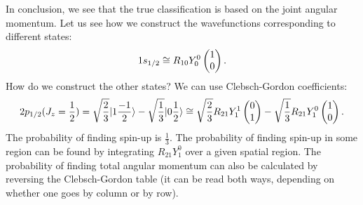 In conclusion, we see that the true classification is based on the joint angular momentum. Let us see how we construct the wavefunctions corresponding to different states:
\begin{equation}
    1s_{1/2} \cong R_{10}Y_0^0\begin{pmatrix}1\\0\end{pmatrix}.
\end{equation}
How do we construct the other states? We can use Clebsch-Gordon coefficients:
\begin{equation}
    2p_{1/2}(J_z = \frac{1}{2}) = \sqrt{\frac{2}{3}}\lvert 1\frac{-1}{2} \rangle - \sqrt{\frac{1}{3}}\lvert 0\frac{1}{2} \rangle \cong \sqrt{\frac{2}{3}}R_{21}Y_1^1\begin{pmatrix}0\\1\end{pmatrix} - \sqrt{\frac{1}{3}}R_{21}Y_1^0\begin{pmatrix}1\\0\end{pmatrix}.
\end{equation}
The probability of finding spin-up is $\frac{1}{3}$. The probability of finding spin-up in some region can be found by integrating $R_{21}Y_1^0$ over a given spatial region. The probability of finding total angular momentum can also be calculated by reversing the Clebsch-Gordon table (it can be read both ways, depending on whether one goes by column or by row).

